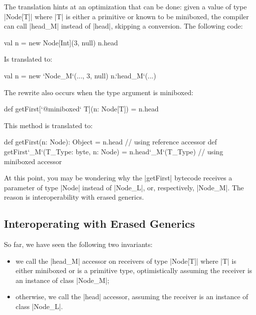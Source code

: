 The translation hints at an optimization that can be done: given a value of type |Node[T]| where |T| is either a primitive or known to be miniboxed, the compiler can call |head_M| instead of |head|, skipping a conversion. The following code:

\begin{lstlisting-nobreak}
 val n = new Node[Int](3, null)
 n.head
\end{lstlisting-nobreak}

Is translated to:

\begin{lstlisting-nobreak}
 val n = new `Node_M`(..., 3, null)
 n.`head_M`(...)
\end{lstlisting-nobreak}

The rewrite also occurs when the type argument is miniboxed:

\begin{lstlisting-nobreak}
 def getFirst[`@miniboxed` T](n: Node[T]) = n.head
\end{lstlisting-nobreak}

This method is translated to:

\begin{lstlisting-nobreak}
 def getFirst(n: Node): Object =
   n.head                 // using reference accessor
 def getFirst`_M`(T_Type: byte, n: Node) =
   n.head`_M`(T_Type) // using miniboxed accessor
\end{lstlisting-nobreak}

At this point, you may be wondering why the |getFirst| bytecode receives a parameter of type |Node| instead of |Node_L|, or, respectively, |Node_M|. The reason is interoperability with erased generics.

\vspace{-0.3em}

\subsection{Interoperating with Erased Generics}
\vspace{-0.2em}

So far, we have seen the following two invariants:
\begin{itemize}
 \item we call the |head_M| accessor on receivers of type |Node[T]| where |T| is either miniboxed or is a primitive type, optimistically assuming the receiver is an instance of class |Node_M|;
 \item otherwise, we call the |head| accessor, assuming the receiver is an instance of class |Node_L|.
\end{itemize}

